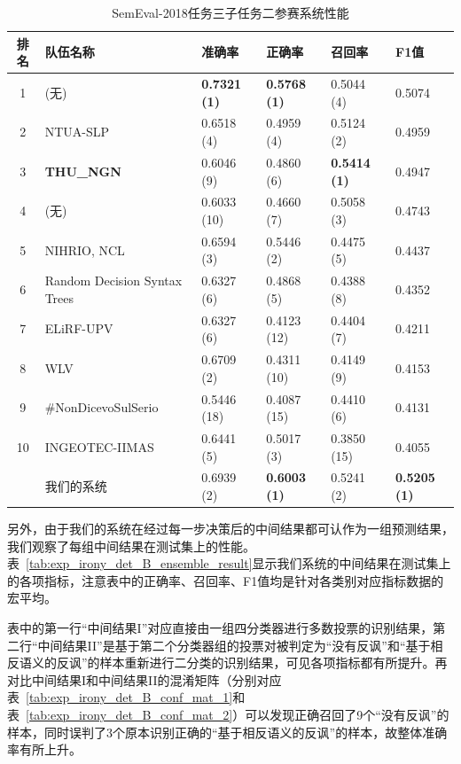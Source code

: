\begin{table}[htb]
  \centering
  \begin{minipage}[t]{\linewidth}
  \caption{SemEval-2018任务三子任务二参赛系统性能} %
  \label{tab:exp_irony_det_B_other_comp}
    \begin{tabularx}{\linewidth}{c|X|llll}
    \toprule[1.5pt]
    排名 & 队伍名称 & 准确率 & 正确率 & 召回率 & F1值 \\
    \hline 
    1 & (无) & \bf 0.7321 (1) & \bf 0.5768 (1) & 0.5044 (4) & 0.5074 \\
    2 & NTUA-SLP & 0.6518 (4) & 0.4959 (4) & 0.5124 (2) & 0.4959 \\
    3 & \bf THU\_NGN & 0.6046 (9) & 0.4860 (6) & \bf 0.5414 (1) & 0.4947 \\
    4 & (无) & 0.6033 (10) & 0.4660 (7) & 0.5058 (3) & 0.4743 \\
    5 & NIHRIO, NCL & 0.6594 (3) & 0.5446 (2) & 0.4475 (5) & 0.4437 \\
    6 & Random Decision Syntax Trees & 0.6327 (6) & 0.4868 (5) & 0.4388 (8) & 0.4352 \\
    7 & ELiRF-UPV & 0.6327 (6) & 0.4123 (12) & 0.4404 (7) & 0.4211 \\
    8 & WLV & 0.6709 (2) & 0.4311 (10) & 0.4149 (9) & 0.4153 \\
    9 & \#NonDicevoSulSerio & 0.5446 (18) & 0.4087 (15) & 0.4410 (6) & 0.4131 \\
    10 & INGEOTEC-IIMAS & 0.6441 (5) & 0.5017 (3) & 0.3850 (15) & 0.4055 \\
    \hline
    & 我们的系统 & 0.6939 (2) & \bf 0.6003 (1) & 0.5241 (2) & \bf 0.5205 (1) \\
    \bottomrule[1.5pt]
    \end{tabularx}
  \end{minipage}
\end{table}

另外，由于我们的系统在经过每一步决策后的中间结果都可认作为一组预测结果，我们观察了每组中间结果在测试集上的性能。表~\ref{tab:exp_irony_det_B_ensemble_result}显示我们系统的中间结果在测试集上的各项指标，注意表中的正确率、召回率、F1值均是针对各类别对应指标数据的宏平均。

表中的第一行“中间结果I”对应直接由一组四分类器进行多数投票的识别结果，第二行“中间结果II”是基于第二个分类器组的投票对被判定为“没有反讽”和“基于相反语义的反讽”的样本重新进行二分类的识别结果，可见各项指标都有所提升。再对比中间结果I和中间结果II的混淆矩阵（分别对应表~\ref{tab:exp_irony_det_B_conf_mat_1}和表~\ref{tab:exp_irony_det_B_conf_mat_2}）可以发现正确召回了9个“没有反讽”的样本，同时误判了3个原本识别正确的“基于相反语义的反讽”的样本，故整体准确率有所上升。

